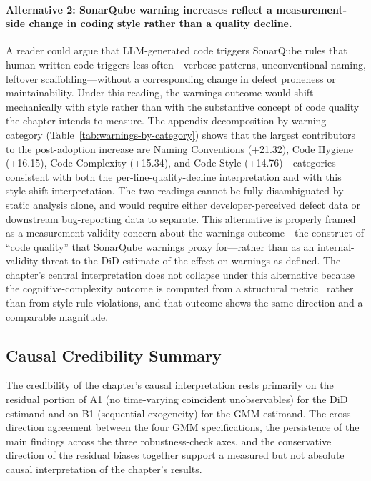 \paragraph{Alternative 2: SonarQube warning increases reflect a measurement-side change in coding style rather than a quality decline.}
A reader could argue that LLM-generated code triggers SonarQube rules that human-written code triggers less often---verbose patterns, unconventional naming, leftover scaffolding---without a corresponding change in defect proneness or maintainability.
Under this reading, the warnings outcome would shift mechanically with style rather than with the substantive concept of code quality the chapter intends to measure.
The appendix decomposition by warning category (Table~\ref{tab:warnings-by-category}) shows that the largest contributors to the post-adoption increase are Naming Conventions (+21.32), Code Hygiene (+16.15), Code Complexity (+15.34), and Code Style (+14.76)---categories consistent with both the per-line-quality-decline interpretation and with this style-shift interpretation.
The two readings cannot be fully disambiguated by static analysis alone, and would require either developer-perceived defect data or downstream bug-reporting data to separate.
This alternative is properly framed as a measurement-validity concern about the warnings outcome---the construct of ``code quality'' that SonarQube warnings proxy for---rather than as an internal-validity threat to the DiD estimate of the effect on warnings as defined.
The chapter's central interpretation does not collapse under this alternative because the cognitive-complexity outcome is computed from a structural metric~\cite{DBLP:conf/icse/Campbell18} rather than from style-rule violations, and that outcome shows the same direction and a comparable magnitude.

\subsection{Causal Credibility Summary}
\label{sec:cursor-credibility-summary}

The credibility of the chapter's causal interpretation rests primarily on the residual portion of A1 (no time-varying coincident unobservables) for the DiD estimand and on B1 (sequential exogeneity) for the GMM estimand.
The cross-direction agreement between the four GMM specifications, the persistence of the main findings across the three robustness-check axes, and the conservative direction of the residual biases together support a measured but not absolute causal interpretation of the chapter's results.

